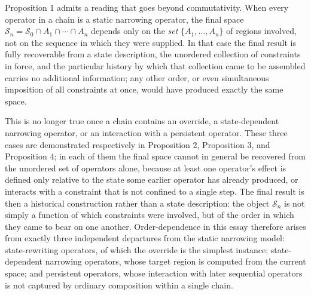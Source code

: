 \documentclass[11pt]{article}
\begin{document}
Proposition 1 admits a reading that goes beyond commutativity. When every operator in a chain is a static narrowing operator, the final space $\mathcal{S}_n = \mathcal{S}_0 \cap A_1 \cap \cdots \cap A_n$ depends only on the \emph{set} $\{A_1, \ldots, A_n\}$ of regions involved, not on the sequence in which they were supplied. In that case the final result is fully recoverable from a state description, the unordered collection of constraints in force, and the particular history by which that collection came to be assembled carries no additional information; any other order, or even simultaneous imposition of all constraints at once, would have produced exactly the same space.

This is no longer true once a chain contains an override, a state-dependent narrowing operator, or an interaction with a persistent operator. These three cases are demonstrated respectively in Proposition 2, Proposition 3, and Proposition 4; in each of them the final space cannot in general be recovered from the unordered set of operators alone, because at least one operator's effect is defined only relative to the state some earlier operator has already produced, or interacts with a constraint that is not confined to a single step. The final result is then a historical construction rather than a state description: the object $\mathcal{S}_n$ is not simply a function of which constraints were involved, but of the order in which they came to bear on one another. Order-dependence in this essay therefore arises from exactly three independent departures from the static narrowing model: state-rewriting operators, of which the override is the simplest instance; state-dependent narrowing operators, whose target region is computed from the current space; and persistent operators, whose interaction with later sequential operators is not captured by ordinary composition within a single chain.
\end{document}
